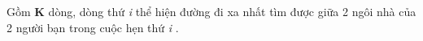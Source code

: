 Gồm \textbf{ K } dòng, dòng thứ \emph{ i } thể hiện đường đi xa nhất tìm được giữa 2 ngôi nhà của 2 người bạn trong cuộc hẹn thứ \emph{ i } .